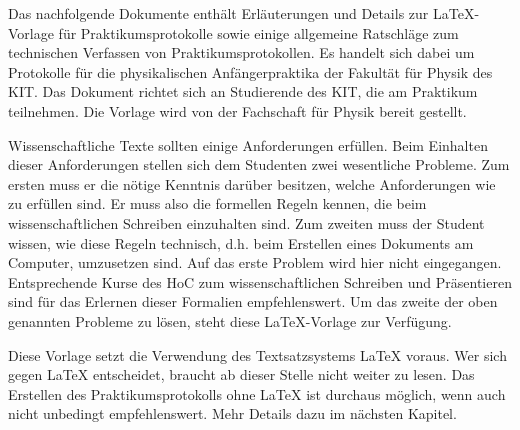 Das nachfolgende Dokumente enthält Erläuterungen und Details zur LaTeX-Vorlage für Praktikumsprotokolle sowie einige allgemeine Ratschläge zum technischen Verfassen von Praktikumsprotokollen. Es handelt sich dabei um Protokolle für die physikalischen Anfängerpraktika der Fakultät für Physik des KIT. Das Dokument richtet sich an Studierende des KIT, die am Praktikum teilnehmen. Die Vorlage wird von der Fachschaft für Physik bereit gestellt.

Wissenschaftliche Texte sollten einige Anforderungen erfüllen. Beim Einhalten dieser Anforderungen stellen sich dem Studenten zwei wesentliche Probleme. Zum ersten muss er die nötige Kenntnis darüber besitzen, welche Anforderungen wie zu erfüllen sind. Er muss also die formellen Regeln kennen, die beim wissenschaftlichen Schreiben einzuhalten sind. Zum zweiten muss der Student wissen, wie diese Regeln technisch, d.h. beim Erstellen eines Dokuments am Computer, umzusetzen sind. Auf das erste Problem wird hier nicht eingegangen. Entsprechende Kurse des HoC zum wissenschaftlichen Schreiben und Präsentieren sind für das Erlernen dieser Formalien empfehlenswert. Um das zweite der oben genannten Probleme zu lösen, steht diese LaTeX-Vorlage zur Verfügung.

Diese Vorlage setzt die Verwendung des Textsatzsystems LaTeX voraus. Wer sich gegen LaTeX entscheidet, braucht ab dieser Stelle nicht weiter zu lesen. Das Erstellen des Praktikumsprotokolls ohne LaTeX ist durchaus möglich, wenn auch nicht unbedingt empfehlenswert. Mehr Details dazu im nächsten Kapitel.